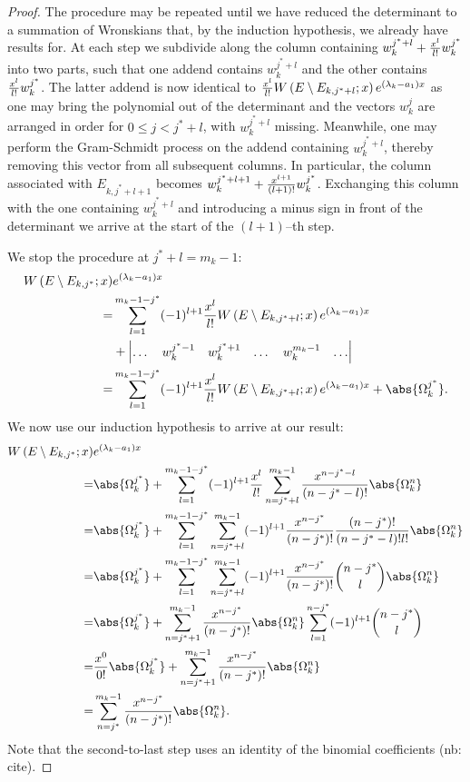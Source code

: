 \documentclass{article}
\begin{document}
\begin{proof}
The procedure may be repeated until we have reduced the determinant to a summation of Wronskians that, by the induction hypothesis, we already have results for.
At each step we subdivide along the column containing $w_k^{j^*+l} + \frac{x^l}{l!} w_k^{j^*}$ into two parts, such that one addend contains $w_k^{j^*+l}$ and the other contains $\frac{x^l}{l!} w_k^{j^*}$.
The latter addend is now identical to $\frac{x^l}{l!} W \left ( E \setminus E_{k,j^*+l} ; x \right ) e^{(\lambda_k - a_1)x}$ as one may bring the polynomial out of the determinant and the vectors $w_k^j$ are arranged in order for $0 \leq j < j^*+l$, with $w_k^{j^*+l}$ missing.
Meanwhile, one may perform the Gram-Schmidt process on the addend containing $w_k^{j^*+l}$, thereby removing this vector from all subsequent columns.
In particular, the column associated with $E_{k,j^*+l+1}$ becomes $w_k^{j^*+l+1} + \frac{x^{l+1}}{(l+1)!} w_k^{j^*}$.
Exchanging this column with the one containing $w_k^{j^*+l}$ and introducing a minus sign in front of the determinant we arrive at the start of the $(l+1)$--th step.

We stop the procedure at $j^*+l=m_k-1$: %
\begin{equation*}
\begin{split}
\W{E \setminus E_{k,j^*}}{x} & e^{(\lambda_k - a_1)x} \\
= & \sum_{l=1}^{m_k-1-j^*} (-1)^{l+1} \Poly{l} \W{E \setminus E_{k,j^*+l}}{x} e^{(\lambda_k - a_1)x} \\
& + \begin{vmatrix} \dots & w_k^{j^*-1} & w_k^{j^*+1} & \dots & w_k^{m_k-1} & \dots \end{vmatrix} \\
= & \sum_{l=1}^{m_k-1-j^*} (-1)^{l+1} \Poly{l} \W{E \setminus E_{k,j^*+l}}{x} e^{(\lambda_k - a_1)x} + \abs{\Omega_k^{j^*}} .
\end{split}
\end{equation*}
We now use our induction hypothesis to arrive at our result:
\begin{equation*}
\begin{split}
\W{E \setminus E_{k,j^*}}{x} & e^{(\lambda_k - a_1)x} \\
= & \abs{\Omega_k^{j^*}} + \sum_{l=1}^{m_k-1-j^*} (-1)^{l+1} \Poly{l} \sum_{n=j^*+l}^{m_k-1} \poly{n-j^*-l} \abs{\Omega_k^n} \\
= & \abs{\Omega_k^{j^*}} + \sum_{l=1}^{m_k-1-j^*} \sum_{n=j^*+l}^{m_k-1} (-1)^{l+1} \poly{n-j^*} \frac{ (n-j^*)! }{(n-j^*-l)! l!} \abs{\Omega_k^n} \\
= & \abs{\Omega_k^{j^*}} + \sum_{l=1}^{m_k-1-j^*} \sum_{n=j^*+l}^{m_k-1} (-1)^{l+1} \poly{n-j^*} \binom{n-j^*}{l} \abs{\Omega_k^n} \\
= & \abs{\Omega_k^{j^*}} + \sum_{n=j^*+1}^{m_k-1} \poly{n-j^*} \abs{\Omega_k^n} \sum_{l=1}^{n-j^*} (-1)^{l+1}  \binom{n-j^*}{l} \\
= & \Poly{0} \abs{\Omega_k^{j^*}} + \sum_{n=j^*+1}^{m_k-1} \poly{n-j^*} \abs{\Omega_k^n} \\
= & \sum_{n=j^*}^{m_k-1} \poly{n-j^*} \abs{\Omega_k^n} .
\end{split}
\end{equation*}
Note that the second-to-last step uses an identity of the binomial coefficients (nb: cite).


\end{proof}
\end{document}
